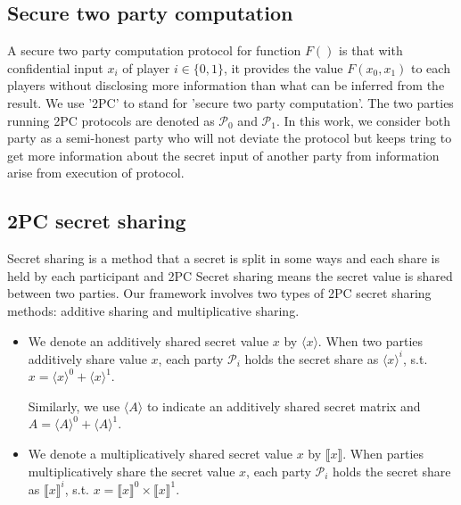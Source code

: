 \documentclass[letterpaper]{article} %
\begin{document}
    \subsection{Secure two party computation}

    A secure two party computation protocol for function $F()$ is that 
    with confidential input $x_{i}$ of player $i \in \{0,1\} $, 
    it provides the value $F(x_{0},x_{1})$ to each players
    without disclosing more information than what can be inferred from the result.
    We use '2PC' to stand for 'secure two party computation'.
    The two parties running 2PC protocols are denoted as $\mathcal{P}_{0} $ and $\mathcal{P}_{1}$.
    In this work, we consider both party as a semi-honest party 
    who will not deviate the protocol but keeps tring to get more information about
    the secret input of another party from information arise from execution of protocol.


    \subsection{2PC secret sharing}
    Secret sharing is a method that a secret is split in some ways and each share is held by each participant
    and 2PC Secret sharing means the secret value is shared between two parties.
    Our framework involves two types of 2PC secret sharing methods: 
    additive sharing and multiplicative sharing.
    
    \begin{itemize}
        \item
        We denote an additively shared secret value $x$ by $\langle x\rangle $. 
        When two parties additively share value $x$, 
        each party $\mathcal{P}_{i}$ holds the secret share as $\langle x\rangle ^{i}$, s.t. 
        $x=\langle x\rangle ^{0}+\langle x\rangle ^{1}$. 
        
        Similarly, we use $\langle A\rangle $ to indicate an additively shared secret matrix
        and $A =\langle A\rangle ^{0}+\langle A\rangle ^{1}$. 

        \item We denote a multiplicatively shared secret value $x$ by $\llbracket x \rrbracket$. 
        When parties multiplicatively share the secret value $x$, 
        each party $\mathcal{P}_{i}$ holds the secret share as $\llbracket x \rrbracket ^{i}$, s.t.
        $x=\llbracket x \rrbracket ^{0}\times \llbracket x \rrbracket ^{1}$.

    \end{itemize}
\end{document}

